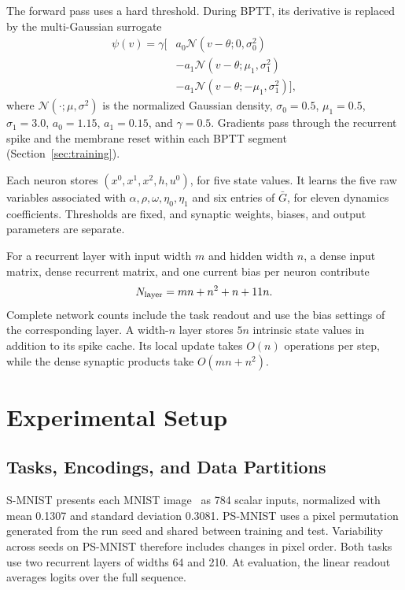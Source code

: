 \documentclass[letterpaper,journal]{IEEEtran}
\begin{document}
The forward pass uses a hard threshold. During BPTT, its derivative is replaced by the multi-Gaussian surrogate~\cite{asrnn}
\begin{equation}
\begin{aligned}
\psi(v)=\gamma\big[&
a_0\mathcal N(v-\theta;0,\sigma_0^2)\\
&-a_1\mathcal N(v-\theta;\mu_1,\sigma_1^2)\\
&-a_1\mathcal N(v-\theta;-\mu_1,\sigma_1^2)\big],
\end{aligned}
\label{eq:surrogate}
\end{equation}
where $\mathcal N(\cdot;\mu,\sigma^2)$ is the normalized Gaussian density,
$\sigma_0=0.5$, $\mu_1=0.5$, $\sigma_1=3.0$,
$a_0=1.15$, $a_1=0.15$, and $\gamma=0.5$.
Gradients pass through the recurrent spike and the membrane reset within each BPTT segment (Section~\ref{sec:training}).

Each neuron stores $(x^0,x^1,x^2,h,u^0)$, for five state values. It learns the five raw variables associated with $\alpha,\rho,\omega,\eta_0,\eta_1$ and six entries of $\bar G$, for eleven dynamics coefficients. Thresholds are fixed, and synaptic weights, biases, and output parameters are separate.

For a recurrent layer with input width $m$ and hidden width $n$, a dense input matrix, dense recurrent matrix, and one current bias per neuron contribute
\begin{equation}
N_{\rm layer}=mn+n^2+n+11n.
\label{eq:parameters}
\end{equation}
Complete network counts include the task readout and use the bias settings of the corresponding layer. A width-$n$ layer stores $5n$ intrinsic state values in addition to its spike cache. Its local update takes $O(n)$ operations per step, while the dense synaptic products take $O(mn+n^2)$.

\section{Experimental Setup}
\label{sec:setup}

\subsection{Tasks, Encodings, and Data Partitions}
\label{sec:data}

S-MNIST presents each MNIST image~\cite{lecun1998gradient} as 784 scalar inputs, normalized with mean 0.1307 and standard deviation 0.3081. PS-MNIST uses a pixel permutation generated from the run seed and shared between training and test. Variability across seeds on PS-MNIST therefore includes changes in pixel order. Both tasks use two recurrent layers of widths 64 and 210. At evaluation, the linear readout averages logits over the full sequence.
\end{document}
